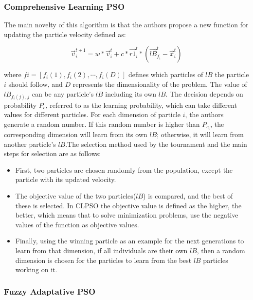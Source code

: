\subsubsection{Comprehensive Learning PSO}


The main novelty of this algorithm is that the authors propose a new function for updating the particle velocity defined as:

\begin{equation}
     \vec{v}_{i}^{t+1}=w\ast \vec{v}_{i}^t + c \ast {\vec{r1}_i^t} \ast \left ( \vec{lB}_{f_i}^t - \vec{x}_{i}^t \right ) 
\end{equation}


\noindent where $fi=[f_i(1),f_i(2),\cdots,f_i(D)]$ defines which particles of $lB$ the particle $i$ should follow, and $D$ represents the dimensionality of the problem. The value of $lB_{f_i(j),j}$ can be any particle’s $lB$ including its own $lB$. The decision depends on probability $P_c$, referred to as the learning probability, which can take different values for different particles.
For each dimension of particle $i$, the authors generate a random number. If this random number is higher than $P_{c_i}$, the corresponding dimension will learn from its own $lB$; otherwise, it will learn from another particle’s $lB$.The selection method used by the tournament and the main steps for selection are as follows:

\begin{itemize}
    \item First, two particles are chosen randomly from the population, except the particle with its updated velocity.
     \item The objective value of the two particles($lB$) is compared, and the best of these is selected. In CLPSO the objective value is defined as the higher, the better, which means that to solve minimization problems, use the negative values of the function as objective values.
      \item Finally, using the winning particle as an example for the next generations to learn from that dimension, if all individuals are their own $lB$, then a random dimension is chosen for the particles to learn from the best $lB$ particles working on it.
\end{itemize}

\subsubsection{Fuzzy Adaptative PSO} 

